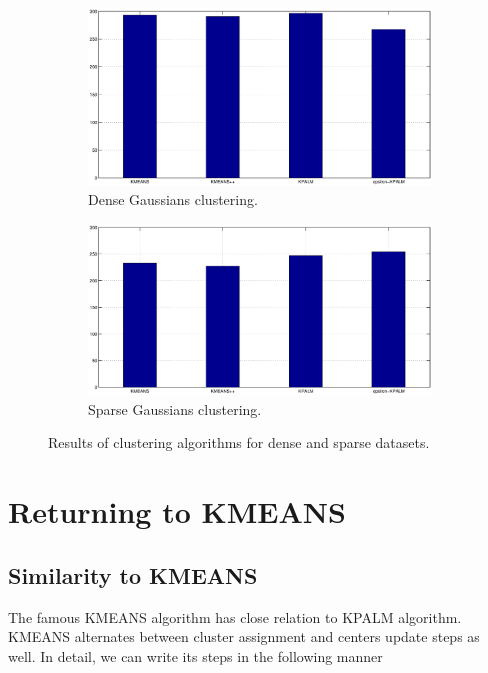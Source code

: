 \documentclass[11pt]{article}
\numberwithin{equation}{section}
\begin{document}
\begin{figure}[h!]
    \centering
    \begin{subfigure}[b]{0.7\textwidth}
        \includegraphics[width=\textwidth]{dense_gaussians_similarity}
        \caption{Dense Gaussians clustering.}
        \label{fig:dense_gaussians_similarity}
    \end{subfigure}
    \begin{subfigure}[b]{0.7\textwidth}
        \includegraphics[width=\textwidth]{sparse_gaussians_similarity}
        \caption{Sparse Gaussians clustering.}
        \label{fig:sparse_gaussians_similarity}
    \end{subfigure}
    \caption{Results of clustering algorithms for dense and sparse datasets.}
    \label{fig:gaussians_similarity}
\end{figure}

\newpage

\section{Returning to KMEANS}
\subsection{Similarity to KMEANS}
The famous KMEANS algorithm has close relation to KPALM algorithm. KMEANS alternates between cluster assignment and centers update steps as well. In detail, we can write its steps in the following manner
\end{document}
